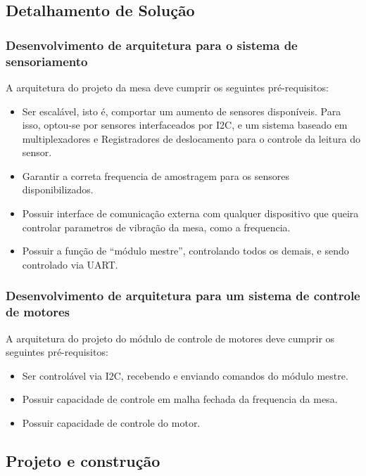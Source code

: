 \subsection{Detalhamento de Solução}

\subsubsection{Desenvolvimento de arquitetura para o sistema de sensoriamento}

A arquitetura do projeto da mesa deve cumprir os seguintes pré-requisitos:

\begin{itemize}
	\item Ser escalável, isto é, comportar um aumento de sensores disponíveis. Para isso, optou-se por sensores interfaceados por I2C, e um sistema baseado em multiplexadores e Registradores de deslocamento para o controle da leitura do sensor.
	\item Garantir a correta frequencia de amostragem para os sensores disponibilizados.
	\item Possuir interface de comunicação externa com qualquer dispositivo que queira controlar parametros de vibração da mesa, como a frequencia.
	\item Possuir a função de “módulo mestre”, controlando todos os demais, e sendo controlado via UART.
\end{itemize}

\subsubsection{Desenvolvimento de arquitetura para um sistema de controle de motores}

A arquitetura do projeto do módulo de controle de motores deve cumprir os seguintes pré-requisitos:

\begin{itemize}
	\item Ser  controlável via I2C, recebendo e enviando comandos do módulo mestre.
	\item Possuir capacidade de controle em malha fechada da frequencia da mesa.
	\item Possuir capacidade de controle do motor.
\end{itemize}

\subsection{Projeto e construção}

